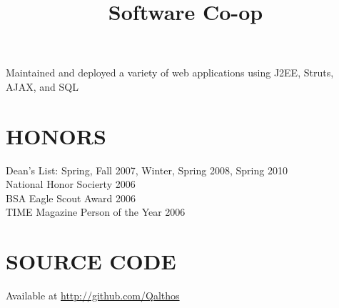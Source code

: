 \documentclass[linemargin]{res}
\begin{document}
\begin{resume}
    \title{Software Co-op}
    \begin{position}
        Maintained and deployed a variety of web applications using J2EE,
        Struts, AJAX, and SQL
    \end{position}

\section{HONORS}
    Dean's List: Spring, Fall 2007, Winter, Spring 2008, Spring 2010 \\
    National Honor Socierty 2006 \\
    BSA Eagle Scout Award 2006 \\
    TIME Magazine Person of the Year 2006 \\

\section{SOURCE CODE}
    Available at \url{http://github.com/Qalthos}\\

\end{resume}
\end{document}
